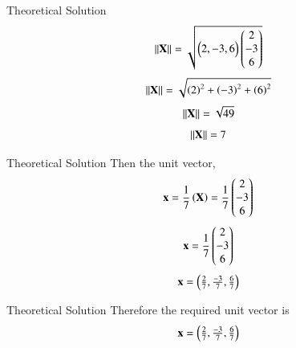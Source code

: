 \documentclass{beamer}
\begin{document}
    \begin{frame}{Theoretical Solution}
        \begin{align}
             \left\lVert\mathbf{X}\right\rVert=\sqrt{\begin{pmatrix}2,-3,6\end{pmatrix}\begin{pmatrix}2\\-3\\6\end{pmatrix}}
         \end{align}
         \begin{align}
             \left\lVert\mathbf{X}\right\rVert=\sqrt{\left(2\right)^2+\left(-3\right)^2+\left(6\right)^2}
         \end{align}
         \begin{align}
             \left\lVert\mathbf{X}\right\rVert=\sqrt{49}
         \end{align}
         \begin{align}
             \left\lVert\mathbf{X}\right\rVert=7
         \end{align}
    \end{frame}
    \begin{frame}{Theoretical Solution}
        Then the unit vector,\\
         \begin{align}
             \mathbf{x}=\frac{1}{7}\left(\mathbf{X}\right)=\frac{1}{7}\begin{pmatrix}2\\-3\\6\end{pmatrix}
         \end{align}
         \begin{align}
             \mathbf{x}=\frac{1}{7}\begin{pmatrix}2\\-3\\6\end{pmatrix}
         \end{align}
         \begin{align}
             \mathbf{x}=\begin{pmatrix}\frac{2}{7},\frac{-3}{7},\frac{6}{7}\end{pmatrix}
         \end{align}
    \end{frame}
    \begin{frame}{Theoretical Solution}
        Therefore the required unit vector is\\
         \begin{align*}
             \mathbf{x}=\begin{pmatrix}\frac{2}{7},\frac{-3}{7},\frac{6}{7}\end{pmatrix}
         \end{align*}
    \end{frame}
	
\end{document}
